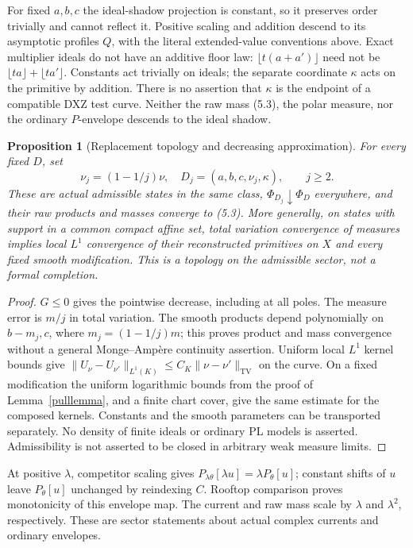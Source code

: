 \documentclass[11pt]{article}
\newtheorem{proposition}[theorem]{Proposition}
\theoremstyle{remark}\newtheorem{remark}[theorem]{Remark}
\newcommand{\TV}{\operatorname{TV}}
\begin{document}
For fixed $a,b,c$ the ideal-shadow projection is constant, so it
preserves order trivially and cannot reflect it. Positive scaling
and addition descend to its asymptotic profiles $Q$, with the
literal extended-value conventions above. Exact multiplier ideals
do not have an additive floor law:
$\lfloor t(a+a')\rfloor$ need not be
$\lfloor ta\rfloor+\lfloor ta'\rfloor$.
Constants act trivially on ideals; the separate coordinate
$\kappa$ acts on the primitive by addition. There is no assertion
that $\kappa$ is the endpoint of a compatible DXZ test curve.
Neither the raw mass (5.3), the polar measure, nor the ordinary
$P$-envelope descends to the ideal shadow.

\begin{proposition}[Replacement topology and decreasing approximation]\label{approx}
For every fixed $D$, set
\[
 \nu_j=(1-1/j)\nu,\quad
 D_j=(a,b,c,\nu_j,\kappa),\qquad j\geq2.
 \tag{5.4}
\]
These are actual admissible states in the same class,
$\Phi_{D_j}\downarrow\Phi_D$ everywhere, and their raw products
and masses converge to (5.3). More generally, on states with
support in a common compact affine set, total variation convergence
of measures implies local $L^1$ convergence of their reconstructed
primitives on $X$ and every fixed smooth modification.
This is a topology on the admissible sector, not a formal completion.
\end{proposition}
\begin{proof}
$G\leq0$ gives the pointwise decrease, including at all poles.
The measure error is $m/j$ in total variation. The smooth products
depend polynomially on $b-m_j,c$, where $m_j=(1-1/j)m$;
this proves product and mass convergence without a general
Monge--Amp\`ere continuity assertion.
Uniform local $L^1$ kernel bounds give
$\|U_\nu-U_{\nu'}\|_{L^1(K)}\leq C_K\|\nu-\nu'\|_{\TV}$
on the curve. On a fixed modification the uniform logarithmic
bounds from the proof of Lemma~\ref{pulllemma}, and a finite chart
cover, give the same estimate for the composed kernels.
Constants and the smooth parameters can be transported separately.
No density of finite ideals or ordinary PL models is asserted.
Admissibility is not asserted to be closed in arbitrary weak
measure limits.
\end{proof}

At positive $\lambda$, competitor scaling gives
$P_{\lambda\theta}[\lambda u]=\lambda P_\theta[u]$;
constant shifts of $u$ leave $P_\theta[u]$ unchanged by reindexing
$C$. Rooftop comparison proves monotonicity of this envelope
map. The current and raw mass scale by $\lambda$ and $\lambda^2$,
respectively. These are sector statements about actual complex
currents and ordinary envelopes.
\end{document}

